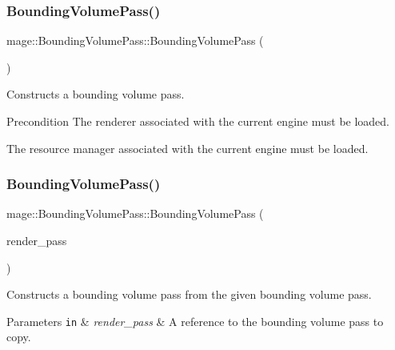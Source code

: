 \subsubsection{\texorpdfstring{Bounding\+Volume\+Pass()}{BoundingVolumePass()}\hspace{0.1cm}{\footnotesize\ttfamily [1/3]}}
{\footnotesize\ttfamily mage\+::\+Bounding\+Volume\+Pass\+::\+Bounding\+Volume\+Pass (\begin{DoxyParamCaption}{ }\end{DoxyParamCaption})}

Constructs a bounding volume pass.

\begin{DoxyPrecond}{Precondition}
The renderer associated with the current engine must be loaded. 

The resource manager associated with the current engine must be loaded. 
\end{DoxyPrecond}
\hypertarget{classmage_1_1_bounding_volume_pass_a21408cc53051c9c6d94efe41b3bea404}{}\label{classmage_1_1_bounding_volume_pass_a21408cc53051c9c6d94efe41b3bea404} 
\subsubsection{\texorpdfstring{Bounding\+Volume\+Pass()}{BoundingVolumePass()}\hspace{0.1cm}{\footnotesize\ttfamily [2/3]}}
{\footnotesize\ttfamily mage\+::\+Bounding\+Volume\+Pass\+::\+Bounding\+Volume\+Pass (\begin{DoxyParamCaption}\item[{const \hyperlink{classmage_1_1_bounding_volume_pass}{Bounding\+Volume\+Pass} \&}]{render\+\_\+pass }\end{DoxyParamCaption})\hspace{0.3cm}{\ttfamily [delete]}}

Constructs a bounding volume pass from the given bounding volume pass.


\begin{DoxyParams}[1]{Parameters}
\mbox{\tt in}  & {\em render\+\_\+pass} & A reference to the bounding volume pass to copy. \\
\hline
\end{DoxyParams}
\hypertarget{classmage_1_1_bounding_volume_pass_a4c40fde630e6ff9bf466293c7bc94157}{}\label{classmage_1_1_bounding_volume_pass_a4c40fde630e6ff9bf466293c7bc94157} 
